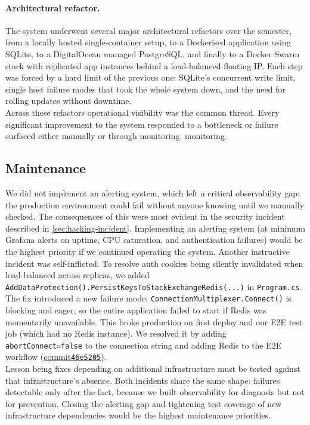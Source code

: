 \paragraph{Architectural refactor.} The system underwent several major architectural refactors over the semester, 
from a locally hosted single-container setup, to a Dockerised application using  SQLite, to a DigitalOcean managed PostgreSQL,
and finally to a Docker Swarm stack with replicated app instances behind a load-balanced floating IP.
Each step was forced by a hard limit of the previous one: SQLite's concurrent write limit, single 
host failure modes that took the whole system down, and the need for rolling updates without downtime.
\\
Across these refactors operational visibility was the common thread. Every significant improvement 
to the system responded to a bottleneck or failure surfaced either manually or through monitoring.
monitoring.

\subsection{Maintenance}
\label{sec:maintenance}
\noindent We did not implement an alerting system, which left a critical observability gap: 
the production environment could fail without anyone knowing until we manually checked. 
The consequences of this were most evident in the security incident described in \cref{sec:hacking-incident}. 
Implementing an alerting system (at minimum Grafana alerts on uptime, CPU saturation, and 
authentication failures) would be the highest priority if we continued operating the system.
Another instructive incident was self-inflicted. To resolve auth cookies being silently invalidated 
when load-balanced across replicas, we added \texttt{AddDataProtection().PersistKeysToStackExchangeRedis(...)} in 
\texttt{Program.cs}. The fix introduced a new failure mode: \texttt{ConnectionMultiplexer.Connect()} is 
blocking and eager, so the entire application failed to start if Redis was momentarily unavailable. 
This broke production on first deploy and our E2E test job (which had no Redis instance). We resolved it by 
adding \texttt{abortConnect=false} to the connection string and adding Redis to the E2E workflow (\href{https://github.com/sebseb10/ITU-MiniTwit/commit/46e5205}{commit\texttt{46e5205}}). \\
Lesson being fixes depending on additional infrastructure must be tested against that infrastructure's absence.
Both incidents share the same shape: failures detectable only after the fact, because we built observability 
for diagnosis but not for prevention. Closing the alerting gap and tightening test coverage 
of new infrastructure dependencies would be the highest maintenance priorities.



